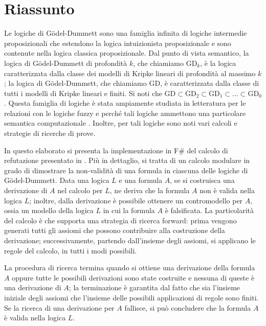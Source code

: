 \documentclass{oist}
\begin{document}
\section*{Riassunto}

Le logiche di G\"odel-Dummett sono una famiglia infinita di logiche
intermedie proposizionali che estendono la logica intuizionista
proposizionale
e sono contenute nella logica classica proposizionale.
Dal punto di vista semantico, la logica di  G\"odel-Dummett di profondit\`a
$k$,
che chiamiamo $\mathrm{GD}_k$,
\`e la logica caratterizzata dalla classe dei modelli di Kripke lineari
di profondit\`a
al massimo $k$; la logica di  G\"odel-Dummett,  che chiamiamo $\mathrm{GD}$,
\`e caratterizzata dalla classe di tutti i  modelli di Kripke lineari e finiti.
Si noti che $\mathrm{GD}\subset\mathrm{GD}_2
    \subset\mathrm{GD}_1\subset\dots\subset \mathrm{GD}_0$.
Questa famiglia di logiche \`e stata ampiamente studiata in letteratura
per le relazioni con le logiche
fuzzy \cite{Hajek:98} e perch\'e tali logiche ammettono una particolare semantica computazionale
\cite{AscCiaGen:2017,Avron:91b}.
Inoltre, per tali logiche sono noti vari calcoli e strategie di ricerche di prove.

In questo elaborato si presenta la implementazione in F\# del calcolo di
refutazione
presentato in \cite{DBLP:conf/cilc/Fiorentini022}.
Pi\`u in dettaglio,
si tratta di un calcolo modulare in grado di dimostrare
la non-validit\`a di una formula in ciascuna delle logiche di
G\"odel-Dummett.
Data una logica $L$ e una formula $A$, se si costruisca una derivazione
di $A$ nel calcolo per $L$,
ne deriva che la formula $A$ non \`e valida nella logica $L$;
inoltre, dalla derivazione \`e possibile ottenere un contromodello per
$A$, ossia un modello
della logica $L$ in cui la formula $A$ \`e falsificata.
La particolarit\`a del calcolo \`e che supporta una strategia di ricerca
forward: prima vengono
generati tutti gli assiomi che possono contribuire alla costruzione
della derivazione;
successivamente, partendo dall'insieme degli assiomi, si applicano le
regole del calcolo, in tutti i modi possibili.

La procedura di ricerca termina quando si ottiene una derivazione della
formula $A$ oppure tutte le possibili derivazioni sono state costruite
e nessuna di queste \`e una derivazione di $A$; la terminazione \`e
garantita
dal fatto che sia l'insieme iniziale degli assiomi che l'insieme delle
possibili applicazioni di regole sono finiti.
Se la ricerca di una derivazione per $A$ fallisce,
si pu\`o concludere che la formula $A$ \`e valida nella logica $L$.
\end{document}
